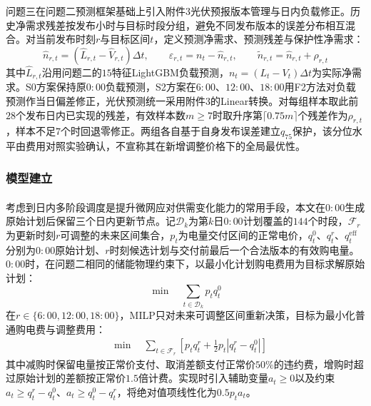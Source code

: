 \documentclass[12pt,a4paper]{ctexart}
\newcommand{\upcite}[1]{\textsuperscript{\cite{#1}}}
\theoremstyle{definition}
\theoremstyle{plain}
\theoremstyle{remark}
\begin{document}
问题三在问题二预测框架基础上引入附件3光伏预报版本管理与日内负载修正。历史净需求残差按发布小时与目标时段分组，避免不同发布版本的误差分布相互混合。对当前发布时刻$r$与目标区间$t$，定义预测净需求、预测残差与保护性净需求：
\begin{equation}
  \widehat{n}_{r,t} = (\widehat{L}_{r,t} - \widehat{V}_{r,t})\Delta t, \qquad
  \varepsilon_{r,t} = n_t - \widehat{n}_{r,t}, \qquad
  \widetilde{n}_{r,t} = \widehat{n}_{r,t} + \rho_{r,t}
  \label{eq:q3_protected}
\end{equation}
\noindent 其中$\widehat{L}_{r,t}$沿用问题二的$15$特征LightGBM负载预测，$n_t=(L_t-V_t)\Delta t$为实际净需求。S0方案保持原$0{:}00$负载预测，S2方案在$6{:}00$、$12{:}00$、$18{:}00$用F2方法对负载预测作当日偏差修正，光伏预测统一采用附件3的Linear转换。对每组样本取此前$28$个发布日内已实现的残差，有效样本数$m\geq7$时取升序第$\lceil0.75m\rceil$个残差作为$\rho_{r,t}$，样本不足$7$个时回退零修正。两组各自基于自身发布误差建立$q_{75}$保护，该分位水平由费用对照实验确认，不宣称其在新增调整价格下的全局最优性。

\subsubsection{模型建立}

\noindent 考虑到日内多阶段调度是提升微网应对供需变化能力的常用手段\upcite{yan2018intraday}，本文在$0{:}00$生成原始计划后保留三个日内更新节点。记$\mathcal{D}_k$为第$k$日$0{:}00$计划覆盖的$144$个时段，$\mathcal{F}_r$为更新时刻$r$可调整的未来区间集合，$p_t$为电量交付区间的正常电价，$q_t^{0}$、$q_t^{r}$、$q_t^{\mathrm{eff}}$分别为$0{:}00$原始计划、$r$时刻候选计划与交付前最后一个合法版本的有效购电量。$0{:}00$时，在问题二相同的储能物理约束下，以最小化计划购电费用为目标求解原始计划：
\begin{equation}
  \boxed{\min \quad \sum_{t\in\mathcal{D}_k} p_t q_t^{0}}
  \label{eq:q3_obj0}
\end{equation}
\noindent 在$r\in\{6{:}00,12{:}00,18{:}00\}$，MILP只对未来可调整区间重新决策，目标为最小化普通购电费与调整费用：
\begin{equation}
  \boxed{\begin{aligned}
  & \min \quad \sum_{t\in\mathcal{F}_r}
  \left[ p_t q_t^{r} + \frac{1}{2} p_t \left| q_t^{r} - q_t^{0} \right| \right]
  \end{aligned}}
  \label{eq:q3_obj_r}
\end{equation}
\noindent 其中减购时保留电量按正常价支付、取消差额支付正常价$50\%$的违约费，增购时超过原始计划的差额按正常价$1.5$倍计费。实现时引入辅助变量$a_t\geq0$以及约束$a_t\geq q_t^{r}-q_t^{0}$、$a_t\geq q_t^{0}-q_t^{r}$，将绝对值项线性化为$0.5p_ta_t$。
\end{document}
